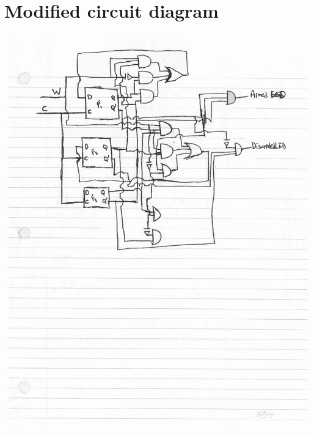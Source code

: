 \documentclass[11pt]{article}
\begin{document}
\section{Modified circuit diagram}
\label{sec-10}
\includegraphics[width=\textwidth]{CD2-1.jpg}
\end{document}
